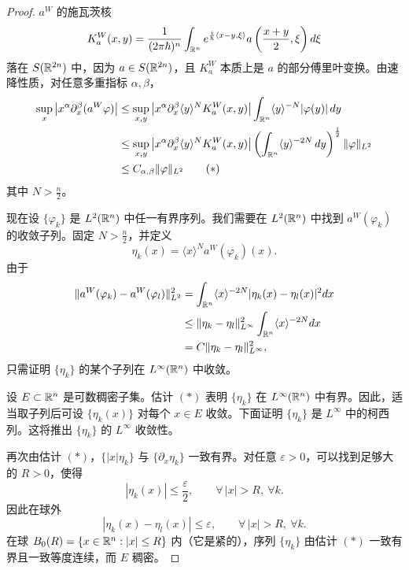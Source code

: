 \begin{proof}
$a^W$ 的施瓦茨核
\[
K_a^W(x,y)=\frac{1}{(2\pi\hbar)^n}\int_{\mathbb{R}^n}e^{\frac i\hbar\langle x-y,\xi\rangle}a\left(\frac{x+y}{2},\xi\right)d\xi
\]
落在 $S(\mathbb{R}^{2n})$ 中，因为 $a\in S(\mathbb{R}^{2n})$，且 $K_a^W$ 本质上是 $a$ 的部分傅里叶变换。由速降性质，对任意多重指标 $\alpha,\beta$，
\begin{align*}
\sup_{x}\left|x^\alpha\partial^\beta_{x}(a^W\varphi)\right|
&\le\sup_{x,y}\left|x^\alpha\partial^\beta_{x}\langle y\rangle^N K_a^W(x,y)\right|\int_{\mathbb{R}^n}\langle y\rangle^{-N}|\varphi(y)|\,dy\\
&\le\sup_{x,y}\left|x^\alpha\partial^\beta_{x}\langle y\rangle^N K_a^W(x,y)\right|
\left(\int_{\mathbb{R}^n}\langle y\rangle^{-2N}\,dy\right)^{\frac12}\|\varphi\|_{L^2}\\
&\le C_{\alpha,\beta}\|\varphi\|_{L^2}\tag{$*$}
\end{align*}
其中 $N>\frac n2$。

现在设 $\{\varphi_k\}$ 是 $L^2(\mathbb{R}^n)$ 中任一有界序列。我们需要在 $L^2(\mathbb{R}^n)$ 中找到 $a^W(\varphi_k)$ 的收敛子列。固定 $N>\frac n2$，并定义
\[
\eta_k(x)=\langle x\rangle^N a^W(\varphi_k)(x).
\]
由于
\begin{align*}
\|a^W(\varphi_k)-a^W(\varphi_l)\|_{L^2}^2
&=\int_{\mathbb{R}^n}\langle x\rangle^{-2N}|\eta_k(x)-\eta_l(x)|^2dx\\
&\le\|\eta_k-\eta_l\|_{L^\infty}^2\int_{\mathbb{R}^n}\langle x\rangle^{-2N}dx\\
&=C\|\eta_k-\eta_l\|_{L^\infty}^2,
\end{align*}
只需证明 $\{\eta_k\}$ 的某个子列在 $L^\infty(\mathbb{R}^n)$ 中收敛。

设 $E\subset\mathbb{R}^n$ 是可数稠密子集。估计 $(*)$ 表明 $\{\eta_k\}$ 在 $L^\infty(\mathbb{R}^n)$ 中有界。因此，适当取子列后可设 $\{\eta_k(x)\}$ 对每个 $x\in E$ 收敛。下面证明 $\{\eta_k\}$ 是 $L^\infty$ 中的柯西列。这将推出 $\{\eta_k\}$ 的 $L^\infty$ 收敛性。

再次由估计 $(*)$，$\{|x|\eta_k\}$ 与 $\{\partial_{x}\eta_k\}$ 一致有界。对任意 $\varepsilon>0$，可以找到足够大的 $R>0$，使得
\[
|\eta_k(x)|\le\frac{\varepsilon}{2},\qquad\forall\,|x|>R,\ \forall k.
\]
因此在球外
\[
|\eta_k(x)-\eta_l(x)|\le\varepsilon,\qquad\forall\,|x|>R,\ \forall k.
\]
在球 $B_0(R)=\{x\in\mathbb{R}^n:|x|\le R\}$ 内（它是紧的），序列 $\{\eta_k\}$ 由估计 $(*)$ 一致有界且一致等度连续，而 $E$ 稠密。



\end{proof}
